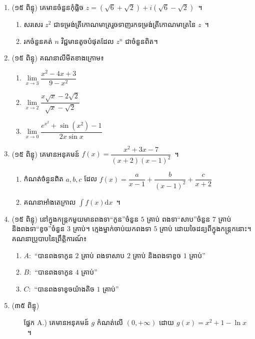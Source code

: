 \documentclass[10pt,a5paper]{article}
\begin{document}
\begin{enumerate}
	\item (១៥ ពិន្ទុ) គេមានចំនួនកុំផ្លិច $ z=(\sqrt{6}+\sqrt{2})+i(\sqrt{6}-\sqrt{2}) $~។
	\begin{enumerate}
		\item សរសេរ $ z^2 $ ជាទម្រង់ត្រីកោណមាត្ររួចទាញរកទម្រង់ត្រីកោណមាត្រនៃ $ z $~។
		\item រកចំនួនគត់ $ n $ វិជ្ជមានតូចបំផុតដែល $ z^n $ ជាចំនួនពិត។
	\end{enumerate}
	\item (១៥ ពិន្ទុ) គណនាលីមីតខាងក្រោម៖
	\begin{multicols}{3}
		\begin{enumerate}
			\item $ \lim\limits_{x\to 3}\dfrac{x^2-4x+3}{9-x^2} $
			\item $ \lim\limits_{x\to 2}\dfrac{x\sqrt{x}-2\sqrt{2}}{\sqrt{x}-\sqrt{2}} $
			\item $ \lim\limits_{x\to 0}\dfrac{e^{x^2}+\sin (x^2)-1}{2x\sin x} $
		\end{enumerate}
	\end{multicols}
	\item (១៥ ពិន្ទុ) គេមានអនុគមន៍ $ f(x)=\dfrac{x^2+3x-7}{(x+2)(x-1)^2} $~។
	\begin{enumerate}
		\item កំណត់ចំនួនពិត $ a,b,c $ ដែល $ f(x)=\dfrac{a}{x-1}+\dfrac{b}{(x-1)^2}+\dfrac{c}{x+2} $
		\item គណនាអាំងតេក្រាល $ \displaystyle\int f(x)\mathrm{d}x $~។
	\end{enumerate}
	\item (១៥ ពិន្ទុ) នៅក្នុងកន្ត្រកមួយមានពងទា``កូន''ចំនួន $ 5 $ គ្រាប់ ពងទា``សាប''ចំនួន $ 7 $ គ្រាប់ និងពងទា``ខូច''ចំនួន $ 3 $ គ្រាប់។ ក្មេងម្នាក់ចាប់យកពងទា $ 5 $ គ្រាប់ ដោយចៃដន្យពីក្នុងកន្ត្រកនោះ។\\
	គណនាប្រូបាបនៃព្រឹត្តិការណ៍៖
	\begin{enumerate}
		\item $ A: $ ``បានពងទាកូន $ 2 $ គ្រាប់ ពងទាសាប $ 2 $ គ្រាប់ និងពងទាខូច $ 1 $ គ្រាប់''
		\item $ B: $ ``បានពងទាកូន $ 4 $ គ្រាប់''
		\item $ C: $ ``បានពងទាខូចយ៉ាងតិច $ 1 $ គ្រាប់''
	\end{enumerate}
	\item (៣៥ ពិន្ទុ) 
	\begin{itemize}
		\item[ផ្នែក A.)] គេមានអនុគមន៍ $ g $ កំណត់លើ $ (0,+\infty) $ ដោយ $ g(x)=x^2+1-\ln x $~។

\end{itemize}
\end{enumerate}
\end{document}
